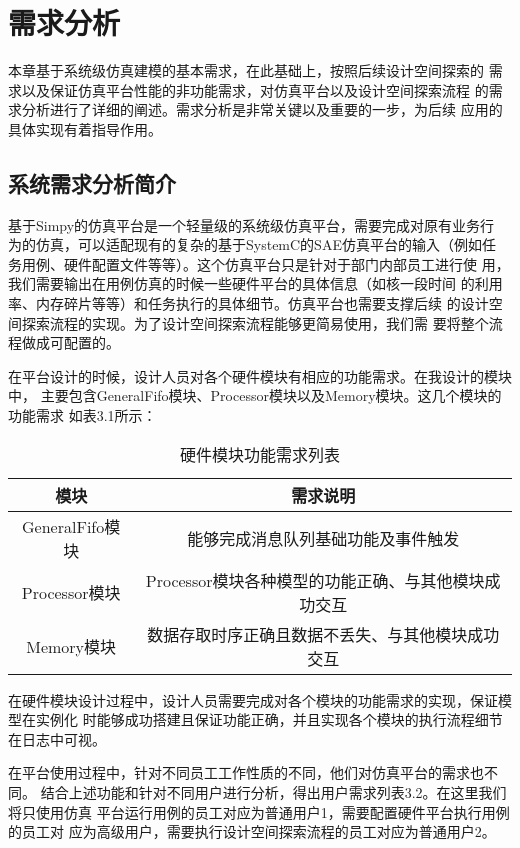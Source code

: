 
\chapter{需求分析}
本章基于系统级仿真建模的基本需求，在此基础上，按照后续设计空间探索的
需求以及保证仿真平台性能的非功能需求，对仿真平台以及设计空间探索流程
的需求分析进行了详细的阐述。需求分析是非常关键以及重要的一步，为后续
应用的具体实现有着指导作用。

\section{系统需求分析简介}
基于Simpy的仿真平台是一个轻量级的系统级仿真平台，需要完成对原有业务行
为的仿真，可以适配现有的复杂的基于SystemC的SAE仿真平台的输入（例如任
务用例、硬件配置文件等等）。这个仿真平台只是针对于部门内部员工进行使
用，我们需要输出在用例仿真的时候一些硬件平台的具体信息（如核一段时间
的利用率、内存碎片等等）和任务执行的具体细节。仿真平台也需要支撑后续
的设计空间探索流程的实现。为了设计空间探索流程能够更简易使用，我们需
要将整个流程做成可配置的。

在平台设计的时候，设计人员对各个硬件模块有相应的功能需求。在我设计的模块中，
主要包含GeneralFifo模块、Processor模块以及Memory模块。这几个模块的功能需求
如表3.1所示：
\begin{table}[]
    \centering\normalsize
    \caption{硬件模块功能需求列表}
    \begin{tabular}{|c|c|}
    \hline
    模块            & 需求说明                           \\ \hline
    GeneralFifo模块 & 能够完成消息队列基础功能及事件触发              \\ \hline
    Processor模块   & Processor模块各种模型的功能正确、与其他模块成功交互 \\ \hline
    Memory模块      & 数据存取时序正确且数据不丢失、与其他模块成功交互       \\ \hline
    \end{tabular}
    \end{table}

在硬件模块设计过程中，设计人员需要完成对各个模块的功能需求的实现，保证模型在实例化
时能够成功搭建且保证功能正确，并且实现各个模块的执行流程细节在日志中可视。

在平台使用过程中，针对不同员工工作性质的不同，他们对仿真平台的需求也不同。
结合上述功能和针对不同用户进行分析，得出用户需求列表3.2。在这里我们将只使用仿真
平台运行用例的员工对应为普通用户1，需要配置硬件平台执行用例的员工对
应为高级用户，需要执行设计空间探索流程的员工对应为普通用户2。

